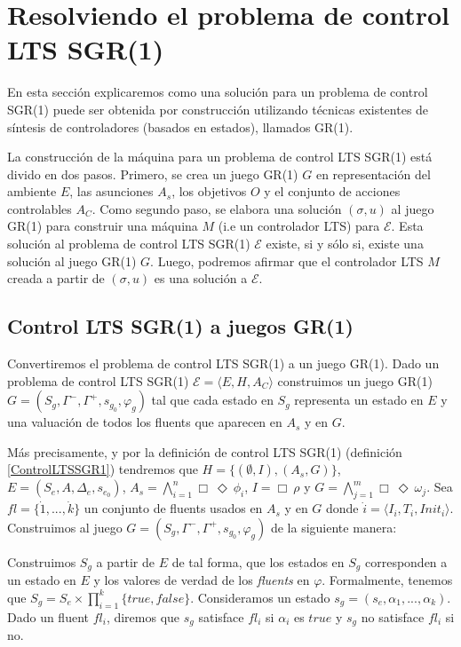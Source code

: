 \section{Resolviendo el problema de control LTS SGR(1)}

En esta sección explicaremos como una solución para un problema de control SGR(1) puede ser obtenida por construcción
utilizando técnicas existentes de síntesis de controladores (basados en estados), llamados GR(1). \cite{Piterman}

La construcción de la máquina para un problema de control LTS SGR(1) está divido en dos pasos. Primero, se crea un juego GR(1)
$G$ en representación del ambiente $E$, las asunciones $A_s$, los objetivos $O$ y el conjunto de acciones controlables
$A_C$. Como segundo paso, se elabora una solución $(\sigma,u)$ al juego GR(1) para construir una máquina $M$ (i.e un
controlador LTS) para $\mathcal{E}$. Esta solución al problema de control LTS SGR(1) $\mathcal{E}$ existe, si y sólo si,
existe una solución al juego GR(1) $G$. Luego, podremos afirmar que el controlador LTS $M$ creada a partir de
$(\sigma,u)$ es una solución a $\mathcal{E}$.

\subsection{Control LTS SGR(1) a juegos GR(1)}

Convertiremos el problema de control LTS SGR(1) a un juego GR(1). Dado un problema de control LTS SGR(1) $\mathcal{E} =
\langle E,H,A_C\rangle$ construimos un juego GR(1) $G = (S_g,\Gamma^-,\Gamma^+,s_{g_0},\varphi_g)$ tal que cada estado en $S_g$
representa un estado en $E$ y una valuación de todos los fluents que aparecen en $A_s$ y en $G$.

Más precisamente, y por la definición de control LTS SGR(1) (definición \ref{ControlLTSSGR1}) tendremos que $H =
\{(\emptyset,I),(A_s,G)\}$, $E = (S_e,A,\Delta_e,s_{e_0})$, $A_s = \bigwedge_{i=1}^n\Box\ \Diamond\ \phi_i$, $I = \Box\
\rho$ y $G = \bigwedge_{j=1}^m\Box\ \Diamond\ \omega_j$. Sea $fl = \{\dot1,...,\dot k\}$ un conjunto de fluents usados en
$A_s$ y en $G$ donde $\dot i = \langle I_i,T_i,Init_i\rangle$. Construimos al juego $G = (S_g,\Gamma^-,\Gamma^+,s_{g_0},\varphi_g)$ de
la siguiente manera:

Construimos $S_g$ a partir de $E$ de tal forma, que los estados en $S_g$ corresponden a un estado en $E$ y los valores
de verdad de los \emph{fluents} en $\varphi$. Formalmente, tenemos que  $S_g = S_e \times \prod_{i=1}^k\{true,false\}$.
Consideramos un estado $s_g = (s_e,\alpha_1,...,\alpha_k)$. Dado un fluent $fl_i$, diremos que $s_g$ satisface $fl_i$ si
$\alpha_i$ es $true$ y $s_g$ no satisface $fl_i$ si no. 

